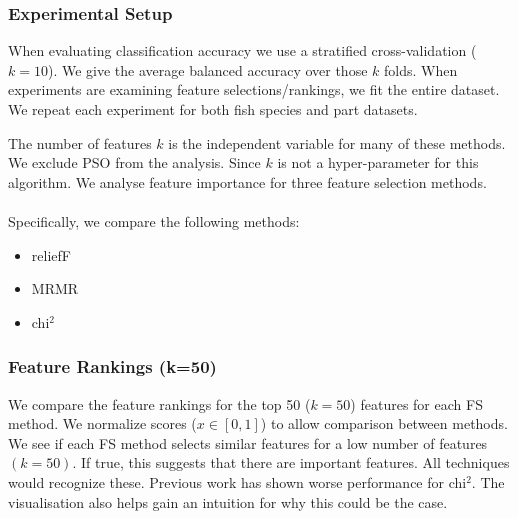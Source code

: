 \documentclass{article}
\begin{document}
\subsubsection{Experimental Setup}

When evaluating classification accuracy we use a stratified cross-validation ($k=10$).
We give the average balanced accuracy over those $k$ folds.
When experiments are examining feature selections/rankings, we fit the entire dataset.
We repeat each experiment for both fish species and part datasets.

The number of features $k$ is the independent variable for many of these methods.
We exclude PSO \cite{kennedy1995particle,kennedy1997discrete} from the analysis.
Since $k$ is not a hyper-parameter for this algorithm.
We analyse feature importance for three feature selection methods.
\\\\
Specifically, we compare the following methods:

\begin{itemize}
  \item reliefF \cite{aizerman1964theoretical}
  \item MRMR \cite{ding2005minimum}
  \item chi$^2$ \cite{liu1995chi2}
\end{itemize}

\subsubsection{Feature Rankings (k=50)}
\label{sec:results-visualisation-feature-rankings-50}

We compare the feature rankings for the top 50 ($k=50$) features for each FS method.
We normalize scores ($x \in [0,1]$) to allow comparison between methods.
We see if each FS method selects similar features for a low number of features $(k = 50)$.
If true, this suggests that there are important features.
All techniques would recognize these. Previous work \cite{wood2021classification,wood2021feature} has shown worse performance for chi$^2$.
The visualisation also helps gain an intuition for why this could be the case.
\end{document}
